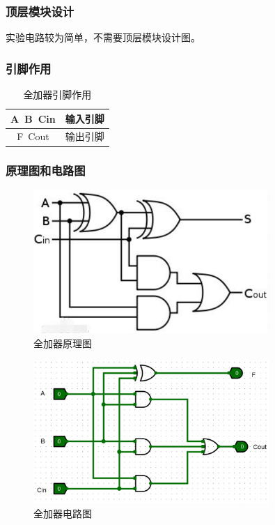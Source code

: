\documentclass{article}
\begin{document}
    \subsubsection{顶层模块设计}
    实验电路较为简单，不需要顶层模块设计图。

    \subsubsection{引脚作用}
    \begin{table}[H]
    \centering
    \begin{tabular}{|c|c|}
        \hline
        A\ B\ Cin & 输入引脚 \\ \hline
        F\ Cout  & 输出引脚 \\ \hline
    \end{tabular}
    \caption{全加器引脚作用}
    \end{table}

    \subsubsection{原理图和电路图}
    \begin{figure}[H]
    \centering
    \includegraphics[width=0.8\textwidth]{3.4.1.png}
    \caption{全加器原理图}
    \end{figure}

    \begin{figure}[H]
    \centering
    \includegraphics[width=0.8\textwidth]{3.4.2.png}
    \caption{全加器电路图}
    \end{figure}
\end{document}

